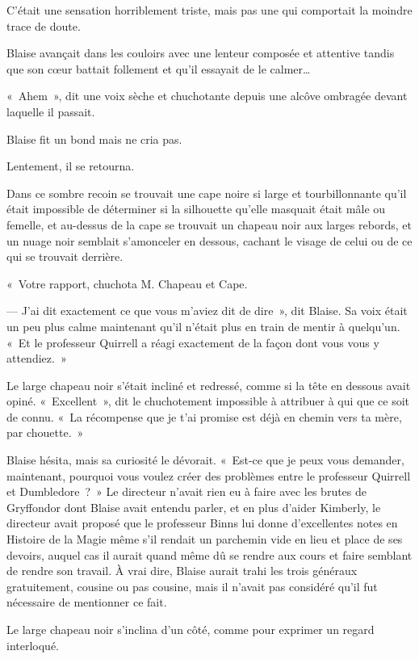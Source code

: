 C'était une sensation horriblement triste, mais pas une qui comportait la moindre trace de doute.


Blaise avançait dans les couloirs avec une lenteur composée et attentive tandis que son cœur battait follement et qu'il essayait de le calmer…

«~Ahem~», dit une voix sèche et chuchotante depuis une alcôve ombragée devant laquelle il passait.

Blaise fit un bond mais ne cria pas.

Lentement, il se retourna.

Dans ce sombre recoin se trouvait une cape noire si large et tourbillonnante qu'il était impossible de déterminer si la silhouette qu'elle masquait était mâle ou femelle, et au-dessus de la cape se trouvait un chapeau noir aux larges rebords, et un nuage noir semblait s'amonceler en dessous, cachant le visage de celui ou de ce qui se trouvait derrière.

«~Votre rapport, chuchota M. Chapeau et Cape.

--- J'ai dit exactement ce que vous m'aviez dit de dire~», dit Blaise. Sa voix était un peu plus calme maintenant qu'il n'était plus en train de mentir à quelqu'un. «~Et le professeur Quirrell a réagi exactement de la façon dont vous vous y attendiez.~»

Le large chapeau noir s'était incliné et redressé, comme si la tête en dessous avait opiné. «~Excellent~», dit le chuchotement impossible à attribuer à qui que ce soit de connu. «~La récompense que je t'ai promise est déjà en chemin vers ta mère, par chouette.~»

Blaise hésita, mais sa curiosité le dévorait. «~Est-ce que je peux vous demander, maintenant, pourquoi vous voulez créer des problèmes entre le professeur Quirrell et Dumbledore~?~» Le directeur n'avait rien eu à faire avec les brutes de Gryffondor dont Blaise avait entendu parler, et en plus d'aider Kimberly, le directeur avait proposé que le professeur Binns lui donne d'excellentes notes en Histoire de la Magie même s'il rendait un parchemin vide en lieu et place de ses devoirs, auquel cas il aurait quand même dû se rendre aux cours et faire semblant de rendre son travail. À vrai dire, Blaise aurait trahi les trois généraux gratuitement, cousine ou pas cousine, mais il n'avait pas considéré qu'il fut nécessaire de mentionner ce fait.

Le large chapeau noir s'inclina d'un côté, comme pour exprimer un regard interloqué.

